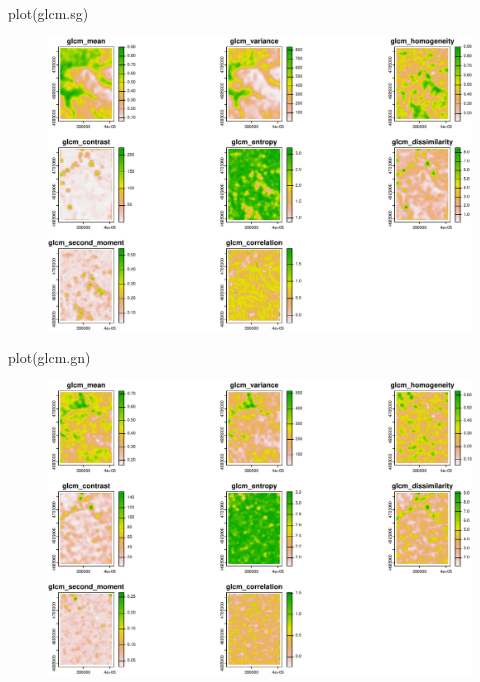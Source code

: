 \documentclass[
  letterpaper,
  DIV=11,
  numbers=noendperiod]{scrartcl}
\newenvironment{Shaded}{\begin{snugshade}}{\end{snugshade}}
\newcommand{\FunctionTok}[1]{\textcolor[rgb]{0.28,0.35,0.67}{#1}}
\newcommand{\NormalTok}[1]{\textcolor[rgb]{0.00,0.23,0.31}{#1}}
\begin{document}
\begin{Shaded}
\begin{Highlighting}[]
\FunctionTok{plot}\NormalTok{(glcm.sg)}
\end{Highlighting}
\end{Shaded}

\begin{figure}[H]

{\centering \includegraphics{PatternAnalysisWorkshopTutorial_files/figure-pdf/measures-1.pdf}

}

\end{figure}

\begin{Shaded}
\begin{Highlighting}[]
\FunctionTok{plot}\NormalTok{(glcm.gn)}
\end{Highlighting}
\end{Shaded}

\begin{figure}[H]

{\centering \includegraphics{PatternAnalysisWorkshopTutorial_files/figure-pdf/measures-2.pdf}

}

\end{figure}
\end{document}
